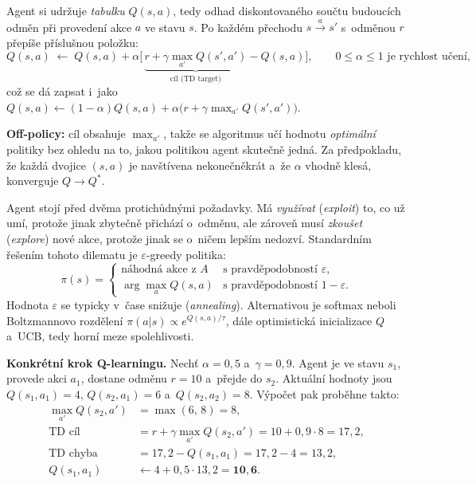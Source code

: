 \documentclass[11pt,a4paper]{article}
\theoremstyle{definition}
\begin{document}
\begin{defbox}
Agent si udržuje \emph{tabulku} $Q(s,a)$, tedy odhad diskontovaného součtu budoucích odměn při
provedení akce $a$ ve stavu $s$. Po každém přechodu $s \xrightarrow{a} s'$ s~odměnou $r$
přepíše příslušnou položku:
\[
Q(s,a) \;\leftarrow\; Q(s,a) + \alpha\Big[\, \underbrace{r + \gamma \max_{a'} Q(s',a')}
_{\text{cíl (TD target)}} - Q(s,a) \Big],
\qquad 0 \le \alpha \le 1 \text{ je rychlost učení,}
\]
což se dá zapsat i~jako
$Q(s,a) \leftarrow (1-\alpha)Q(s,a) + \alpha\big(r + \gamma\max_{a'}Q(s',a')\big)$.

\textbf{Off-policy:} cíl obsahuje $\max_{a'}$, takže se algoritmus učí hodnotu \emph{optimální}
politiky bez ohledu na to, jakou politikou agent skutečně jedná. Za předpokladu, že každá
dvojice $(s,a)$ je navštívena nekonečněkrát a~že $\alpha$ vhodně klesá, konverguje $Q \to Q^*$.
\end{defbox}

\begin{defbox}
Agent stojí před dvěma protichůdnými požadavky. Má \emph{využívat} (\emph{exploit}) to, co už
umí, protože jinak zbytečně přichází o~odměnu, ale zároveň musí \emph{zkoušet} (\emph{explore})
nové akce, protože jinak se o~ničem lepším nedozví. Standardním řešením tohoto dilematu je
$\varepsilon$-greedy politika:
\[
\pi(s) = \begin{cases}
\text{náhodná akce z } A & \text{s pravděpodobností } \varepsilon,\\
\arg\max_a Q(s,a) & \text{s pravděpodobností } 1-\varepsilon .
\end{cases}
\]
Hodnota $\varepsilon$ se typicky v~čase snižuje (\emph{annealing}). Alternativou je
softmax neboli Boltzmannovo rozdělení $\pi(a|s) \propto e^{Q(s,a)/\tau}$, dále optimistická
inicializace $Q$ a~UCB, tedy horní meze spolehlivosti.
\end{defbox}

\medskip
\noindent\textbf{Konkrétní krok Q-learningu.} Nechť $\alpha = 0{,}5$ a~$\gamma = 0{,}9$.
Agent je ve stavu $s_1$, provede akci $a_1$, dostane odměnu $r = 10$ a~přejde do $s_2$.
Aktuální hodnoty jsou $Q(s_1,a_1) = 4$, $Q(s_2,a_1) = 6$ a~$Q(s_2,a_2) = 8$. Výpočet pak
proběhne takto:
\begin{align*}
\max_{a'} Q(s_2,a') &= \max(6,\,8) = 8, \\
\text{TD cíl} &= r + \gamma \max_{a'} Q(s_2,a') = 10 + 0{,}9 \cdot 8 = 17{,}2, \\
\text{TD chyba} &= 17{,}2 - Q(s_1,a_1) = 17{,}2 - 4 = 13{,}2, \\
Q(s_1,a_1) &\leftarrow 4 + 0{,}5 \cdot 13{,}2 = \mathbf{10{,}6}.
\end{align*}
\end{document}
